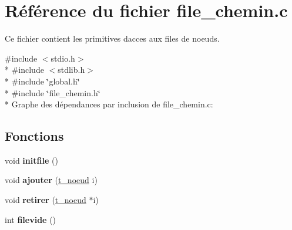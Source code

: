 \hypertarget{a00015}{}\section{Référence du fichier file\+\_\+chemin.\+c}
\label{a00015}


Ce fichier contient les primitives d\textquotesingle{}acces aux files de noeuds.  


{\ttfamily \#include $<$stdio.\+h$>$}\\*
{\ttfamily \#include $<$stdlib.\+h$>$}\\*
{\ttfamily \#include \char`\"{}global.\+h\char`\"{}}\\*
{\ttfamily \#include \char`\"{}file\+\_\+chemin.\+h\char`\"{}}\\*
Graphe des dépendances par inclusion de file\+\_\+chemin.\+c\+:
\subsection*{Fonctions}
\begin{DoxyCompactItemize}
\item 
void {\bfseries initfile} ()\hypertarget{a00015_aaf4be56c084d19f107f0da19c7c17216}{}\label{a00015_aaf4be56c084d19f107f0da19c7c17216}

\item 
void {\bfseries ajouter} (\hyperlink{a00008}{t\+\_\+noeud} i)\hypertarget{a00015_a102c68ec4d3006b943c1e63ad7bcd563}{}\label{a00015_a102c68ec4d3006b943c1e63ad7bcd563}

\item 
void {\bfseries retirer} (\hyperlink{a00008}{t\+\_\+noeud} $\ast$i)\hypertarget{a00015_a04ee1626a03e6867490802212829ccc5}{}\label{a00015_a04ee1626a03e6867490802212829ccc5}

\item 
int {\bfseries filevide} ()\hypertarget{a00015_a1dfabfa7163dc55b1cfa0f9317ee5bc8}{}\label{a00015_a1dfabfa7163dc55b1cfa0f9317ee5bc8}

\end{DoxyCompactItemize}
